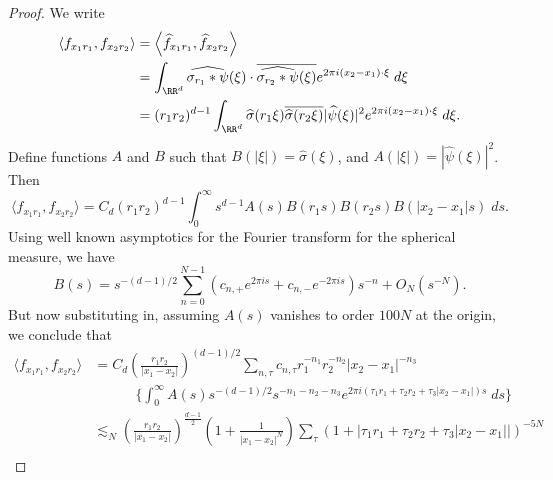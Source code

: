 \begin{proof}
%
    We write
    \begin{align*}
        \langle f_{x_1 r_1}, f_{x_2 r_2} \rangle &= \left\langle \widehat{f}_{x_1 r_1}, \widehat{f}_{x_2 r_2} \right\rangle\\
        &= \int_{\RR^d} \widehat{\sigma_{r_1} * \psi}(\xi) \cdot \overline{\widehat{\sigma_{r_2} * \psi}(\xi)} e^{2 \pi i (x_2 - x_1) \cdot \xi}\; d\xi\\
        &= (r_1 r_2)^{d-1} \int_{\RR^d} \widehat{\sigma}(r_1 \xi) \overline{\widehat{\sigma}(r_2 \xi)} |\widehat{\psi}(\xi)|^2 e^{2 \pi i (x_2 - x_1) \cdot \xi}\; d\xi.
    \end{align*}
    Define functions $A$ and $B$ such that $B(|\xi|) = \widehat{\sigma}(\xi)$, and $A(|\xi|) = |\widehat{\psi}(\xi)|^2$. Then
    \[ \langle f_{x_1 r_1}, f_{x_2 r_2} \rangle = C_d (r_1r_2)^{d-1} \int_0^\infty s^{d-1} A(s) B(r_1 s) B(r_2 s) B(|x_2 - x_1| s)\; ds. \]
    Using well known asymptotics for the Fourier transform for the spherical measure, we have
    \[ B(s) = s^{-(d-1)/2} \sum_{n = 0}^{N-1} (c_{n,+} e^{2 \pi i s} + c_{n,-} e^{-2 \pi i s}) s^{-n} + O_N(s^{-N}). \]
    But now substituting in, assuming $A(s)$ vanishes to order $100N$ at the origin, we conclude that
    \begin{align*}
        \langle f_{x_1 r_1}, f_{x_2 r_2} \rangle &= C_d \left( \frac{r_1r_2}{|x_1 - x_2|} \right)^{(d-1)/2} \sum_{n,\tau} c_{n,\tau}  r_1^{-n_1} r_2^{-n_2} |x_2 - x_1|^{-n_3}\\
        &\quad\quad\quad \Bigg\{ \int_0^\infty A(s) s^{-(d-1)/2}  s^{-n_1-n_2-n_3} e^{2 \pi i (\tau_1 r_1 + \tau_2 r_2 + \tau_3 |x_2 - x_1|) s}\; ds \Bigg\}\\
        &\lesssim_N \left( \frac{r_1r_2}{|x_1 - x_2|} \right)^{\frac{d-1}{2}} \left(1 + \frac{1}{|x_1 - x_2|^N} \right) \sum_{\tau} \left( 1 + |\tau_1 r_1 + \tau_2 r_2 + \tau_3 |x_2 - x_1|| \right)^{-5N}\\

\end{align*}
\end{proof}
